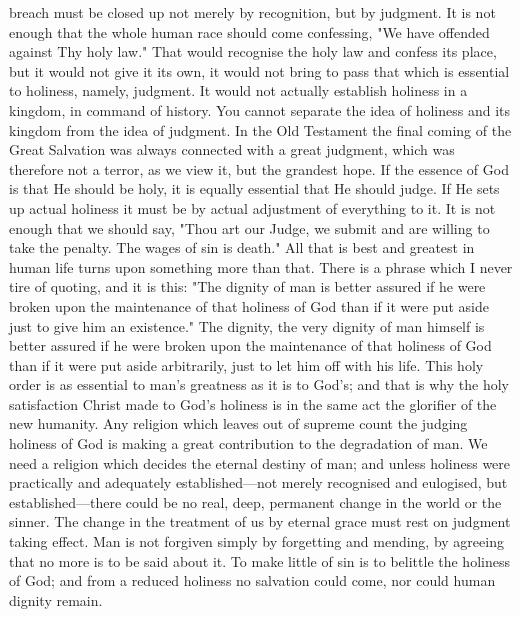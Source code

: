 \documentclass[12pt,a5paper,twoside,titlepage]{book}
\begin{document}
breach must be closed up not merely by recognition, 
but by judgment. It is not enough that 
the whole human race should come confessing, 
"We have offended against Thy holy law." 
That would recognise the holy law and confess 
its place, but it would not give it its own, it 
would not bring to pass that which is essential 
to holiness, namely, judgment. It would not 
actually establish holiness in a kingdom, in 
command of history. You cannot separate the 
idea of holiness and its kingdom from the idea 
of judgment. In the Old Testament the final 
coming of the Great Salvation was always connected 
with a great judgment, which was 
therefore not a terror, as we view it, but the 
grandest hope. If the essence of God is that He 
should be holy, it is equally essential that He 
should judge. If He sets up actual holiness it 
must be by actual adjustment of everything 
to it. It is not enough that we should say, 
"Thou art our Judge, we submit and are willing 
to take the penalty. The wages of sin is 
death." All that is best and greatest in human 
life turns upon something more than that. 
There is a phrase which I never tire of quoting, 
and it is this: "The dignity of man is better 
assured if he were broken upon the maintenance 
of that holiness of God than if it 
were put aside just to give him an existence." 
The dignity, the very dignity of man himself 
is better assured if he were broken upon the 
maintenance of that holiness of God than if it 
were put aside arbitrarily, just to let him off 
with his life. This holy order is as essential 
to man's greatness as it is to God's; and that is 
why the holy satisfaction Christ made to God's 
holiness is in the same act the glorifier of 
the new humanity. Any religion which leaves 
out of supreme count the judging holiness 
of God is making a great contribution to the 
degradation of man. We need a religion which 
decides the eternal destiny of man; and unless 
holiness were practically and adequately established---not
merely recognised and eulogised, 
but established---there could be no real, deep, 
permanent change in the world or the sinner. 
The change in the treatment of us by eternal 
grace must rest on judgment taking effect. 
Man is not forgiven simply by forgetting and 
mending, by agreeing that no more is to be 
said about it. To make little of sin is to 
belittle the holiness of God; and from a reduced 
holiness no salvation could come, nor 
could human dignity remain. 
\end{document}
